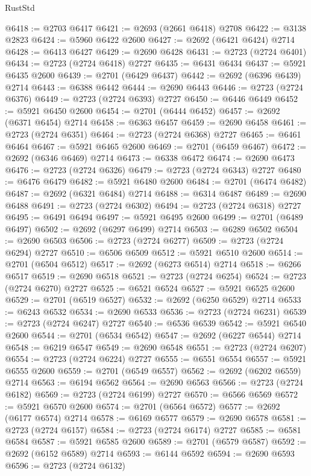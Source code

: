\begin{lexlean}{RustStd}
\begin{coremodule}
{\begin{coremodule}
{{{{{{{{{{{{{{{{{{{{{{{{{{{{{{{{{{{{{{{@6418 := @2703 @6417
@6421 := @2693 (@2661 @6418) @2708
@6422 := @3138 @2823
@6424 := @5960 @6422 @2600
@6427 := @2692 (@6421 @6424) @2714
@6428 := @6413 @6427
@6429 := @2690 @6428
@6431 := @2723 (@2724 @6401)
@6434 := @2723 (@2724 @6418) @2727
@6435 := @6431 @6434
@6437 := @5921 @6435 @2600
@6439 := @2701 (@6429 @6437)
@6442 := @2692 (@6396 @6439) @2714
@6443 := @6388 @6442
@6444 := @2690 @6443
@6446 := @2723 (@2724 @6376)
@6449 := @2723 (@2724 @6393) @2727
@6450 := @6446 @6449
@6452 := @5921 @6450 @2600
@6454 := @2701 (@6444 @6452)
@6457 := @2692 (@6371 @6454) @2714
@6458 := @6363 @6457
@6459 := @2690 @6458
@6461 := @2723 (@2724 @6351)
@6464 := @2723 (@2724 @6368) @2727
@6465 := @6461 @6464
@6467 := @5921 @6465 @2600
@6469 := @2701 (@6459 @6467)
@6472 := @2692 (@6346 @6469) @2714
@6473 := @6338 @6472
@6474 := @2690 @6473
@6476 := @2723 (@2724 @6326)
@6479 := @2723 (@2724 @6343) @2727
@6480 := @6476 @6479
@6482 := @5921 @6480 @2600
@6484 := @2701 (@6474 @6482)
@6487 := @2692 (@6321 @6484) @2714
@6488 := @6314 @6487
@6489 := @2690 @6488
@6491 := @2723 (@2724 @6302)
@6494 := @2723 (@2724 @6318) @2727
@6495 := @6491 @6494
@6497 := @5921 @6495 @2600
@6499 := @2701 (@6489 @6497)
@6502 := @2692 (@6297 @6499) @2714
@6503 := @6289 @6502
@6504 := @2690 @6503
@6506 := @2723 (@2724 @6277)
@6509 := @2723 (@2724 @6294) @2727
@6510 := @6506 @6509
@6512 := @5921 @6510 @2600
@6514 := @2701 (@6504 @6512)
@6517 := @2692 (@6273 @6514) @2714
@6518 := @6266 @6517
@6519 := @2690 @6518
@6521 := @2723 (@2724 @6254)
@6524 := @2723 (@2724 @6270) @2727
@6525 := @6521 @6524
@6527 := @5921 @6525 @2600
@6529 := @2701 (@6519 @6527)
@6532 := @2692 (@6250 @6529) @2714
@6533 := @6243 @6532
@6534 := @2690 @6533
@6536 := @2723 (@2724 @6231)
@6539 := @2723 (@2724 @6247) @2727
@6540 := @6536 @6539
@6542 := @5921 @6540 @2600
@6544 := @2701 (@6534 @6542)
@6547 := @2692 (@6227 @6544) @2714
@6548 := @6219 @6547
@6549 := @2690 @6548
@6551 := @2723 (@2724 @6207)
@6554 := @2723 (@2724 @6224) @2727
@6555 := @6551 @6554
@6557 := @5921 @6555 @2600
@6559 := @2701 (@6549 @6557)
@6562 := @2692 (@6202 @6559) @2714
@6563 := @6194 @6562
@6564 := @2690 @6563
@6566 := @2723 (@2724 @6182)
@6569 := @2723 (@2724 @6199) @2727
@6570 := @6566 @6569
@6572 := @5921 @6570 @2600
@6574 := @2701 (@6564 @6572)
@6577 := @2692 (@6177 @6574) @2714
@6578 := @6169 @6577
@6579 := @2690 @6578
@6581 := @2723 (@2724 @6157)
@6584 := @2723 (@2724 @6174) @2727
@6585 := @6581 @6584
@6587 := @5921 @6585 @2600
@6589 := @2701 (@6579 @6587)
@6592 := @2692 (@6152 @6589) @2714
@6593 := @6144 @6592
@6594 := @2690 @6593
@6596 := @2723 (@2724 @6132)
}}}}}}}}}}}}}}}}}}}}}}}}}}}}}}}}}}}}}}}
\end{coremodule}}
\end{coremodule}
\end{lexlean}
